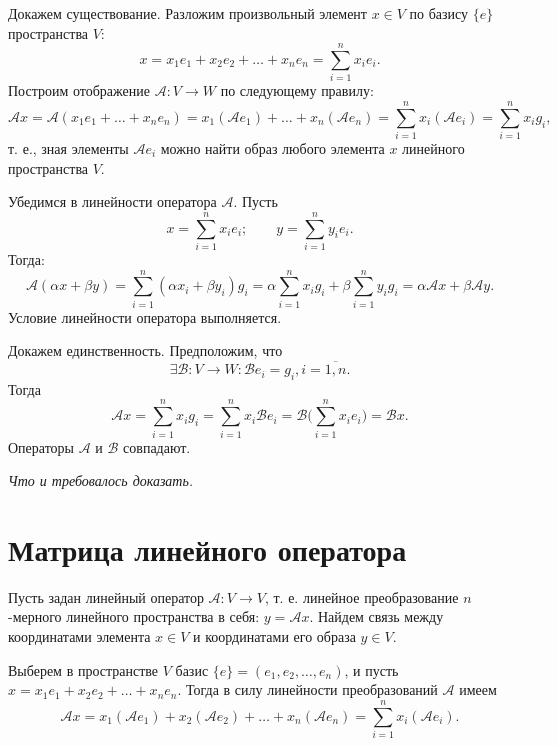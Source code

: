 \documentclass[a5paper, 11pt]{extbook}
\theoremstyle{definition}
\theoremstyle{definition}
\theoremstyle{definition}
\newcommand{\newpar}{$ $\par\nobreak\ignorespaces}
\renewenvironment{proof}{{\noindent\bfseries Доказательство.}}{\smallskip\newpar \hfill\textit{Что и требовалось доказать.}}
\begin{document}
\begin{proof}
    Докажем существование. Разложим произвольный элемент \(x \in V\) по базису \(\{e\}\) пространства \(V\):
    \[
        x = x_1 e_1 + x_2 e_2 + \ldots + x_n e_n = \sum_{i = 1}^n x_i e_i.
    \]
    Построим отображение \(\mathcal{A}: V \to W\) по следующему правилу:
    \[
        \mathcal{A} x =
        \mathcal{A} (x_1 e_1 + \ldots + x_n e_n) =
        x_1 (\mathcal{A} e_1) + \ldots + x_n (\mathcal{A} e_n) =
        \sum_{i = 1}^n x_i (\mathcal{A} e_i) = \sum_{i = 1}^n x_i g_i,
    \]
    т. е., зная элементы \(\mathcal{A} e_i\) можно найти образ любого элемента \(x\) линейного пространства \(V\).

    Убедимся в линейности оператора \(\mathcal{A}\). Пусть
    \[
        x = \sum_{i = 1}^n x_i e_i;
        \qquad
        y = \sum_{i = 1}^n y_i e_i.
    \]
    Тогда:
    \[
        \mathcal{A} (\alpha x + \beta y) =
        \sum_{i = 1}^n (\alpha x_i + \beta y_i) g_i =
        \alpha \sum_{i = 1}^n x_i g_i + \beta \sum_{i = 1}^n y_i g_i =
        \alpha \mathcal{A} x + \beta \mathcal{A} y.
    \]
    Условие линейности оператора выполняется.

    Докажем единственность. Предположим, что
    \[
        \exists \mathcal{B}: V \to W : \mathcal{B} e_i = g_i, i = \overline{1, n}.
    \]
    Тогда
    \[
        \mathcal{A} x =
        \sum_{i = 1}^n x_i g_i =
        \sum_{i = 1}^n x_i \mathcal{B} e_i =
        \mathcal{B} \Big( \sum_{i = 1}^n x_i e_i \Big) =
        \mathcal{B} x.
    \]
    Операторы \(\mathcal{A}\) и \(\mathcal{B}\) совпадают.
\end{proof}

\section{Матрица линейного оператора}

Пусть задан линейный оператор \(\mathcal{A}: V \to V\), т. е. линейное преобразование \(n\)-мерного линейного пространства в себя: \(y = \mathcal{A} x\). Найдем связь между координатами элемента \(x \in V\) и координатами его образа \(y \in V\).

Выберем в пространстве \(V\) базис \(\{e\} = (e_1, e_2, \ldots, e_n)\), и пусть \(x = x_1 e_1 + x_2 e_2 + \ldots + x_n e_n\). Тогда в силу линейности преобразований \(\mathcal{A}\) имеем
\[
    \mathcal{A} x =
    x_1 (\mathcal{A} e_1) + x_2 (\mathcal{A} e_2) + \ldots + x_n (\mathcal{A} e_n) =
    \sum_{i = 1}^n x_i (\mathcal{A} e_i).
\]
\end{document}
